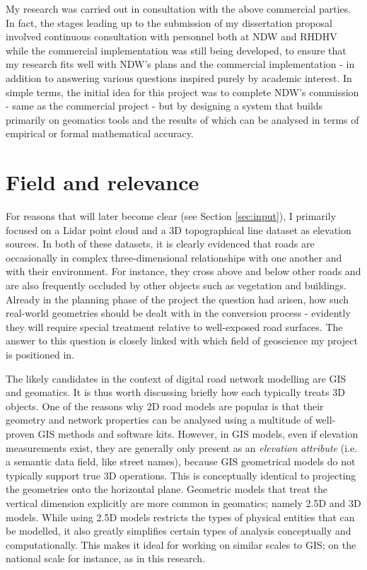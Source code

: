 My research was carried out in consultation with the above commercial parties. In fact, the stages leading up to the submission of my dissertation proposal involved continuous consultation with personnel both at NDW and RHDHV while the commercial implementation was still being developed, to ensure that my research fits well with NDW's plans and the commercial implementation - in addition to answering various questions inspired purely by academic interest. In simple terms, the initial idea for this project was to complete NDW's commission - same as the commercial project - but by designing a system that builds primarily on geomatics tools and the results of which can be analysed in terms of empirical or formal mathematical accuracy.

\section{Field and relevance}
\label{sec:relevance}

For reasons that will later become clear (see Section \ref{sec:input}), I primarily focused on a Lidar point cloud and a 3D topographical line dataset as elevation sources. In both of these datasets, it is clearly evidenced that roads are occasionally in complex three-dimensional relationships with one another and with their environment. For instance, they cross above and below other roads and are also frequently occluded by other objects such as vegetation and buildings. Already in the planning phase of the project the question had arisen, how such real-world geometries should be dealt with in the conversion process - evidently they will require special treatment relative to well-exposed road surfaces. The answer to this question is closely linked with which field of geoscience my project is positioned in.

The likely candidates in the context of digital road network modelling are GIS and geomatics. It is thus worth discussing briefly how each typically treats 3D objects. One of the reasons why 2D road models are popular is that their geometry and network properties can be analysed using a multitude of well-proven GIS methods and software kits. However, in GIS models, even if elevation measurements exist, they are generally only present as an \textit{elevation attribute} (i.e. a semantic data field, like street names), because GIS geometrical models do not typically support true 3D operations. This is conceptually identical to projecting the geometries onto the horizontal plane. Geometric models that treat the vertical dimension explicitly are more common in geomatics; namely 2.5D and 3D models. While using 2.5D models restricts the types of physical entities that can be modelled, it also greatly simplifies certain types of analysis conceptually and computationally. This makes it ideal for working on similar scales to GIS; on the national scale for instance, as in this research.

